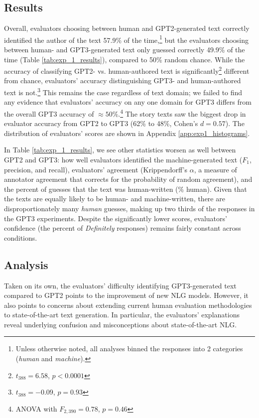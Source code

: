 \subsection{Results}
Overall, evaluators choosing between human and GPT2-generated text correctly identified the author of the text 57.9\% of the time,\footnote{Unless otherwise noted, all analyses binned the responses into 2 categories (\textit{human} and \textit{machine}).} but the evaluators choosing between human- and GPT3-generated text only guessed correctly 49.9\% of the time (Table \ref{tab:exp_1_results}), compared to 50\% random chance.
While the accuracy of classifying GPT2- vs. human-authored text is significantly\footnote{$t_{388}=6.58$, $p<0.0001$} different from chance, evaluators' accuracy distinguishing GPT3- and human-authored text is not.\footnote{$t_{388}=-0.09$, $p=0.93$}
This remains the case regardless of text domain; we failed to find any evidence that evaluators' accuracy on any one domain for GPT3 differs from the overall GPT3 accuracy of $\approx50$\%.\footnote{ANOVA with $F_{2,390}=0.78$, $p=0.46$}
The story texts saw the biggest drop in evaluator accuracy from GPT2 to GPT3 (62\% to 48\%, Cohen's $d=0.57$).
The distribution of evaluators' scores are shown in Appendix \ref{app:exp1_histograms}.

In Table \ref{tab:exp_1_results}, we see other statistics worsen as well between GPT2 and GPT3: how well evaluators identified the machine-generated text ($F_1$, precision, and recall), evaluators' agreement (Krippendorff's $\alpha$, a measure of annotator agreement that corrects for the probability of random agreement), and the percent of guesses that the text was human-written (\% human).
Given that the texts are equally likely to be human- and machine-written, there are disproportionately many \textit{human} guesses, making up two thirds of the responses in the GPT3 experiments.
Despite the significantly lower scores, evaluators' confidence (the percent of \textit{Definitely} responses) remains fairly constant across conditions.

\subsection{Analysis}
Taken on its own, the evaluators' difficulty identifying GPT3-generated text compared to GPT2 points to the improvement of new NLG models.
However, it also points to concerns about extending current human evaluation methodologies to state-of-the-art text generation.
In particular, the evaluators' explanations reveal underlying confusion and misconceptions about state-of-the-art NLG.

